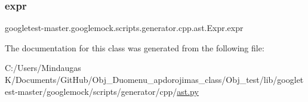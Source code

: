 \subsubsection{\texorpdfstring{expr}{expr}}
{\footnotesize\ttfamily googletest-\/master.\+googlemock.\+scripts.\+generator.\+cpp.\+ast.\+Expr.\+expr}



The documentation for this class was generated from the following file\+:\begin{DoxyCompactItemize}
\item 
C\+:/\+Users/\+Mindaugas K/\+Documents/\+Git\+Hub/\+Obj\+\_\+\+Duomenu\+\_\+apdorojimas\+\_\+class/\+Obj\+\_\+test/lib/googletest-\/master/googlemock/scripts/generator/cpp/\mbox{\hyperlink{_obj__test_2lib_2googletest-master_2googlemock_2scripts_2generator_2cpp_2ast_8py}{ast.\+py}}\end{DoxyCompactItemize}
